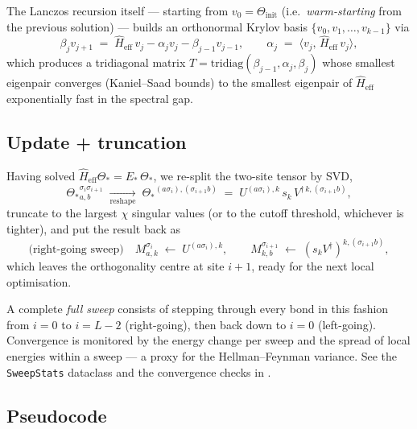\documentclass[11pt,a4paper]{article}
\theoremstyle{plain}
\theoremstyle{definition}
\theoremstyle{remark}
\renewcommand{\op}[1]{\hat{#1}}
\newcommand{\codefile}[1]{\path{#1}}
\begin{document}
The Lanczos recursion itself --- starting from $v_0 = \Theta_{\text{init}}$
(i.e.\ \emph{warm-starting} from the previous solution) ---
builds an orthonormal Krylov basis
$\{v_0, v_1, \dots, v_{k-1}\}$ via
\begin{equation}
  \beta_j v_{j+1} \;=\; \op H_{\mathrm{eff}}\,v_j - \alpha_j v_j - \beta_{j-1} v_{j-1},
  \qquad
  \alpha_j \;=\; \langle v_j,\,\op H_{\mathrm{eff}}\,v_j\rangle,
\end{equation}
which produces a tridiagonal matrix
$T = \mathrm{tridiag}(\beta_{j-1},\alpha_j,\beta_j)$ whose smallest eigenpair
converges (Kaniel--Saad bounds) to the smallest eigenpair of
$\op H_{\mathrm{eff}}$ exponentially fast in the spectral gap.

\subsection{Update + truncation}

Having solved $\op H_{\mathrm{eff}} \Theta_* = E_*\,\Theta_*$, we re-split the
two-site tensor by SVD,
\begin{equation}
  {\Theta_*}^{\sigma_i\sigma_{i+1}}_{a,b}
  \;\xrightarrow[\text{reshape}]{}\;
  {\Theta_*}^{(a\sigma_i),(\sigma_{i+1}b)}
  \;=\;
  U^{(a\sigma_i),k}\,s_k\,V^{\dagger\,k,(\sigma_{i+1}b)},
\end{equation}
truncate to the largest $\chi$ singular values (or to the cutoff threshold,
whichever is tighter), and put the result back as
\begin{equation}
  \text{(right-going sweep)}\quad
  M^{\sigma_i}_{a,k} \;\leftarrow\; U^{(a\sigma_i),k},
  \qquad
  M^{\sigma_{i+1}}_{k,b} \;\leftarrow\; (s_k V^{\dagger})^{k,(\sigma_{i+1}b)},
\end{equation}
which leaves the orthogonality centre at site $i+1$, ready for the next
local optimisation.

A complete \emph{full sweep} consists of stepping through every bond in this
fashion from $i=0$ to $i=L-2$ (right-going), then back down to $i=0$
(left-going).  Convergence is monitored by the energy change per sweep and
the spread of local energies within a sweep --- a proxy for the Hellman--Feynman
variance.  See the \texttt{SweepStats} dataclass and the convergence checks
in \codefile{src/dmrg_pp/algorithms/dmrg.py}.

\subsection{Pseudocode}
\end{document}
